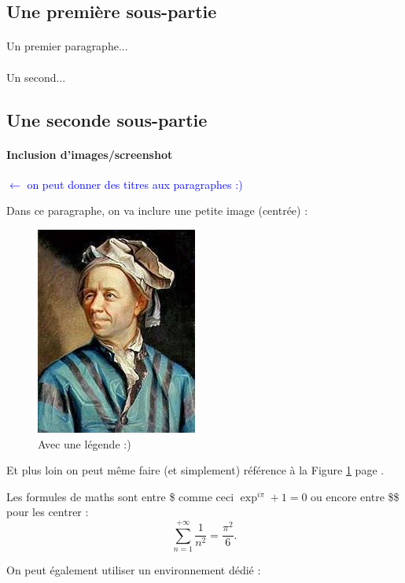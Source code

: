 \documentclass[a4paper, 12pt]{article}
\begin{document}
\subsection{Une première sous-partie}
\paragraph{}
Un premier paragraphe...
\paragraph{}
Un second...

\subsection{Une seconde sous-partie}
\paragraph{Inclusion d'images/screenshot} \textcolor{blue}{$\leftarrow$ on peut donner des titres aux paragraphes :)} 

Dans ce paragraphe, on va inclure une petite image (centrée) :

\begin{figure}[h]
\centering
\includegraphics[scale=.5]{images/euler.jpg}
\caption{\label{euler}Avec une légende :)}
\end{figure}

Et plus loin on peut même faire (et simplement) référence à la Figure \ref{euler} page \pageref{euler}.

Les formules de maths sont entre \$ comme ceci $\exp^{i\pi} + 1 = 0$ ou encore entre \$\$ pour les centrer : $$\sum_{n=1}^{+\infty} \frac{1}{n^2} = \frac{\pi^2}{6}.$$

On peut également utiliser un environnement dédié :
\end{document}
